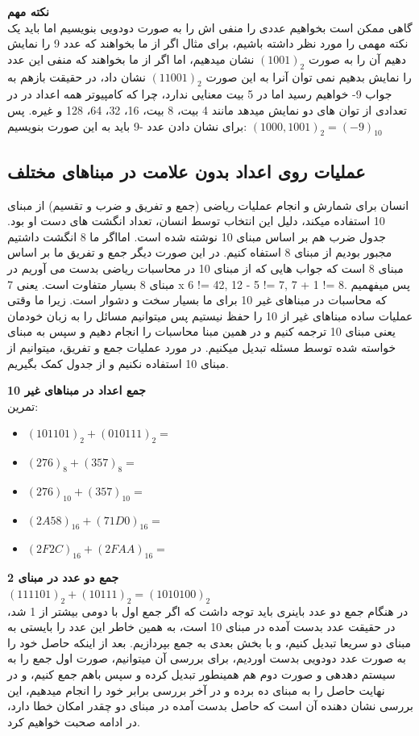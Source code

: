 \documentclass[pt, a5paper]{article}
\begin{document}
\raggedright
\justifying
\textbf{نکته مهم}\\
گاهی ممکن است بخواهیم عددی را منفی اش را به صورت دودویی بنویسیم اما باید یک نکته مهمی را مورد نظر داشته باشیم، برای مثال اگر از ما بخواهند که عدد 9 را نمایش دهیم آن را به صورت
$(1001)_{2}$
نشان میدهیم، اما اگر از ما بخواهند که منفی این عدد را نمایش بدهیم نمی توان آنرا به این صورت
$(11001)_{2}$
نشان داد، در حقیقت بازهم به جواب 9- خواهیم رسید اما در 5 بیت معنایی ندارد، چرا که کامپیوتر همه اعداد در در تعدادی از توان های دو نمایش میدهد مانند 4 بیت، 8 بیت، 16، 32، 64، 128 و غیره. پس برای نشان دادن عدد -9 باید به این صورت بنویسیم:
$({1}000,1001)_{2} = (-9)_{10}$


\subsection{عملیات روی اعداد بدون علامت در مبناهای مختلف}
انسان برای شمارش و انجام عملیات ریاضی (جمع و تفریق و ضرب و تقسیم) از مبنای 10 استفاده میکند، دلیل این انتخاب توسط انسان، تعداد انگشت های دست او بود. جدول ضرب هم بر اساس مبنای 10 نوشته شده است. امااگر ما 8 انگشت داشتیم مجبور بودیم از مبنای 8 استفاه کنیم. در این صورت دیگر جمع و تفریق ما بر اساس مبنای 8 است که جواب هایی که از مبنای 10 در محاسبات ریاضی بدست می آوریم در مبنای 8 بسیار متفاوت است. یعنی 
7 x 6 != 42, 
12 - 5 != 7, 
7 + 1 != 8.
پس میفهمیم که محاسبات در مبناهای غیر 10 برای ما بسیار سخت و دشوار است. زیرا ما وقتی عملیات ساده مبناهای غیر از 10 را حفظ نیستیم پس میتوانیم مسائل را به زبان خودمان یعنی مبنای 10 ترجمه کنیم و در همین مبنا محاسبات را انجام دهیم و سپس به مبنای خواسته شده توسط مسئله تبدیل میکنیم. در مورد عملیات جمع و تفریق، میتوانیم از مبنای 10 استفاده نکنیم و از جدول کمک بگیریم.


\textbf{جمع اعداد در مبناهای غیر 10}\\
تمرین:\\
\begin{itemize}\raggedright
	\item 
	$(101101)_{2} + (010111)_{2} = $
	\item 
	$(276)_{8} + (357)_{8} = $
	\item 
	$(276)_{10} + (357)_{10} = $
	\item 
	$(2A58)_{16} + (71D0)_{16} = $
	\item 
	$(2F2C)_{16} + (2FAA)_{16} = $
\end{itemize}

\raggedleft
\justifying
\textbf{جمع دو عدد در مبنای 2}\\
$(111101)_{2} + (10111)_{2} = (1010100)_{2}$\\
در هنگام جمع دو عدد باینری باید توجه داشت که اگر جمع اول با دومی بیشتر از 1 شد، در حقیقت عدد بدست آمده در مبنای 10 است، به همین خاطر این عدد را بایستی به مبنای دو سریعا تبدیل کنیم، و با بخش بعدی به جمع بپردازیم. بعد از اینکه حاصل خود را به صورت عدد دودویی بدست اوردیم، برای بررسی آن میتوانیم، صورت اول جمع را به سیستم دهدهی و صورت دوم هم همینطور تبدیل کرده و سپس باهم جمع کنیم، و در نهایت حاصل را به مبنای ده برده و در آخر بررسی برابر خود را انجام میدهیم، این بررسی نشان دهنده آن است که حاصل بدست آمده در مبنای دو چقدر امکان خطا دارد، در ادامه صحبت خواهیم کرد.\\
\end{document}
